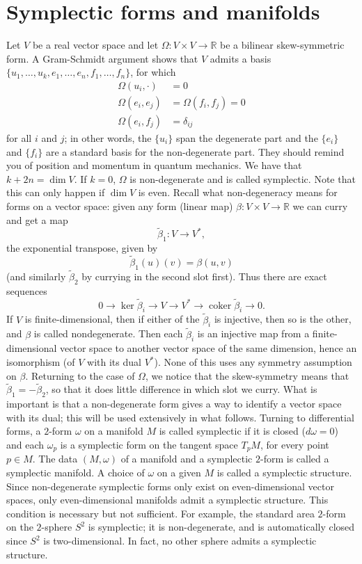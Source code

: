 \documentclass[11pt]{article} %
\begin{document}
\section*{Symplectic forms and manifolds}
Let $V$ be a real vector space and let $\Omega: V\times V \rightarrow \mathbb{R}$ be a bilinear skew-symmetric form. A Gram-Schmidt argument shows that $V$ admits a basis $\{u_1, \dots, u_k, e_1, \dots, e_n, f_1, \dots, f_n\}$, for which
\begin{align*}
 \Omega(u_i, \cdot)  &= 0  \\
 \Omega(e_i, e_j) &= \Omega(f_i, f_j) = 0 \\
\Omega(e_i, f_j) &= \delta_{ij}
\end{align*}
for all $i$ and $j$; in other words, the $\{u_i\}$ span the degenerate part and the $\{e_i\}$ and $\{f_i\}$ are a standard basis for the non-degenerate part. They should remind you of position and momentum in quantum mechanics. We have that $k + 2n = \operatorname{dim}V$. If $k=0$, $\Omega$ is non-degenerate and is called symplectic. Note that this can only happen if $ \operatorname{dim}V$ is even. Recall what non-degeneracy means for forms on a vector space: given any form (linear map) $\beta: V\times V \rightarrow \mathbb{R}$ we can curry and get a map
$$
\tilde{\beta}_1: V \rightarrow V^\ast,
$$
the exponential transpose, given by
$$
\tilde{\beta}_1(u)(v) = \beta(u,v)
$$
(and similarly $\tilde{\beta}_2$ by currying in the second slot first). Thus there are exact sequences
$$
0 \rightarrow \operatorname{ker}\tilde{\beta}_i \rightarrow V \rightarrow V^\ast \rightarrow \operatorname{coker}\tilde{\beta}_i \rightarrow 0.
$$
If $V$ is finite-dimensional, then if either of the $\tilde{\beta}_i$ is injective, then so is the other, and $\beta$ is called nondegenerate. Then each $\tilde{\beta}_i$ is an injective map from a finite-dimensional vector space to another vector space of the same dimension, hence an isomorphism (of $V$ with its dual $V^\ast$). None of this uses any symmetry assumption on $\beta$. Returning to the case of $\Omega$, we notice that the skew-symmetry means that $\tilde{\beta}_1 = - \tilde{\beta}_2$, so that it does little difference in which slot we curry. What is important is that a non-degenerate form gives a way to identify a vector space with its dual; this will be used extensively in what follows. Turning to differential forms, a $2$-form $\omega$ on a manifold $M$ is called symplectic if it is closed ($d\omega = 0$) and each $\omega_p$ is a symplectic form on the tangent space $T_pM$, for every point $p\in M$. The data $(M, \omega)$ of a manifold and a symplectic $2$-form is called a symplectic manifold. A choice of $\omega$ on a given $M$ is called a symplectic structure. Since non-degenerate symplectic forms only exist on even-dimensional vector spaces, only even-dimensional manifolds admit a symplectic structure. This condition is necessary but not sufficient. For example, the standard area $2$-form on the $2$-sphere $S^2$ is symplectic; it is non-degenerate, and is automatically closed since $S^2$ is two-dimensional. In fact, no other sphere admits a symplectic structure.\\
\end{document}
